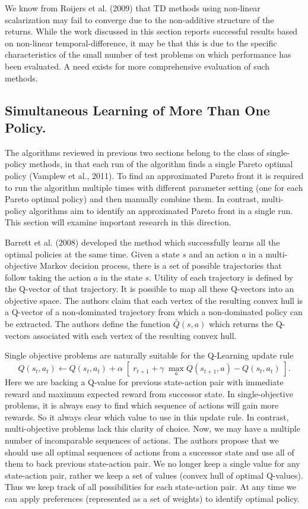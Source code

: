 We know from Roijers et al. (2009)\nocite{roijers2013survey} that TD methods using non-linear scalarization may fail to converge due to the non-additive structure of the returns. While the work discussed in this section reports successful results based on non-linear temporal-difference, it may be that this is due to the specific characteristics of the small number of test problems on which performance has been evaluated. A need exists for more comprehensive evaluation of such methods.

\subsection{Simultaneous Learning of More Than One Policy.}

The algorithms reviewed in previous two sections belong to the class of single-policy methods, in that each run of the algorithm finds a single Pareto optimal policy (Vamplew et al., 2011\nocite{vamplew2011empirical}). To find an approximated Pareto front it is required to run the algorithm multiple times with different parameter setting (one for each Pareto optimal policy) and then manually combine them. In contrast, multi-policy algorithms aim to identify an approximated Pareto front in a single run. This section will examine important research in this direction.

Barrett et al. (2008) \nocite{barrett2008learning} developed the method which successfully learns all the optimal policies at the same time. Given a state $s$ and an action $a$ in a multi-objective Markov decision process, there is a set of possible trajectories that follow taking the action $a$ in the state $s$. Utility of each trajectory is defined by the Q-vector of that trajectory. It is possible to map all these Q-vectors into an objective space. The authors claim that each vertex of the resulting convex hull is a Q-vector of a non-dominated trajectory from which a non-dominated policy can be extracted. The authors define the function $\overset{\circ}{Q}(s,a)$ which returns the Q-vectors associated with each vertex of the resulting convex hull.

Single objective problems are naturally suitable for the Q-Learning update rule
$$ Q(s_{t},a_{t}) \leftarrow Q(s_{t},a_{t}) + \alpha \; \left[\;r_{t+1} + \gamma\; \max_{a}Q(s_{t+1},a) - Q(s_{t},a_{t})\;\right]. $$
Here we are backing a Q-value for previous state-action pair with immediate reward and maximum expected reward from successor state. In single-objective problems, it is always easy to find which sequence of actions will gain more rewards. So it always clear which value to use in this update rule. In contrast, multi-objective problems lack this clarity of choice. Now, we may have a multiple number of incomparable sequences of actions. The authors propose that we should use all optimal sequences of actions from a successor state and use all of them to back previous state-action pair. We no longer keep a single value for any state-action pair, rather we keep a set of values (convex hull of optimal Q-values). Thus we keep track of all possibilities for each state-action pair. At any time we can apply preferences (represented as a set of weights) to identify optimal policy.


